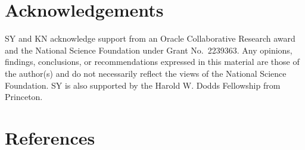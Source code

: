 \documentclass[
]{article}
\begin{document}
\section{Acknowledgements}\label{acknowledgements}

SY and KN acknowledge support from an Oracle Collaborative Research
award and the National Science Foundation under Grant No.~2239363. Any
opinions, findings, conclusions, or recommendations expressed in this
material are those of the author(s) and do not necessarily reflect the
views of the National Science Foundation. SY is also supported by the
Harold W. Dodds Fellowship from Princeton.

\section{References}\label{references}
\end{document}
